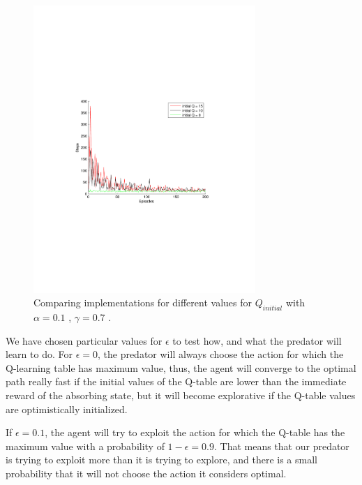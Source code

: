 \documentclass[a4paper,11pt]{article}
\begin{document}
\begin{figure}[t!]
  \centering
    \includegraphics[trim=4cm 8.5cm 4cm 8.5cm,clip,width=0.75\textwidth]{figures/qcomp.pdf}
    \caption{Comparing implementations for different values for $Q_{initial}$  with $\alpha = 0.1$ , $\gamma=0.7$ .}
\end{figure}



We have chosen particular values for $\epsilon$ to test how, and what the predator will learn to do. For $\epsilon = 0$, the predator will always choose the action for which the Q-learning table has maximum value, thus, the agent will converge to the optimal path really fast if the initial values of the Q-table are lower than the immediate reward of the absorbing state, but it will become explorative if the Q-table values are optimistically initialized.


If $\epsilon = 0.1$, the agent will try to exploit the action for which the Q-table has the maximum value with a probability of $1-\epsilon = 0.9$. That means that our predator is trying to exploit more than it is trying to explore, and there is a small probability that it will not choose the action it considers optimal.
\end{document}
